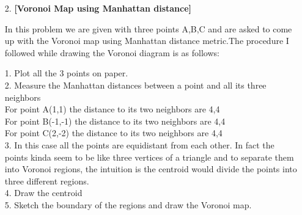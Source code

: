 \documentclass[11pt]{article}
\begin{document}
\begin{enumerate}
	\begin{figure}[H]%
		\centering
	\end{figure}	
	 
\item[2.] \textbf{[Voronoi Map using Manhattan distance]}	

In this problem we are given with three points A,B,C and are asked to come up with the Voronoi map using Manhattan distance metric.The procedure I followed while drawing the Voronoi diagram is as follows:

1. Plot all the 3 points on paper.\\
2. Measure the Manhattan distances between a point and all its three neighbors \\

For point A(1,1) the distance to its two neighbors are 4,4\\
For point B(-1,-1) the distance to its two neighbors are 4,4\\
For point C(2,-2) the distance to its two neighbors are 4,4\\

3. In this case all the points are equidistant from each other. In fact the points kinda seem to be like three vertices of a triangle and to separate them into Voronoi regions, the intuition is the centroid would divide the points into three different regions. \\
4. Draw the centroid \\
5. Sketch the boundary of the regions and draw the Voronoi map.

	\begin{figure}[H]%
		\centering
	\end{figure}	


\end{enumerate}
\end{document}
